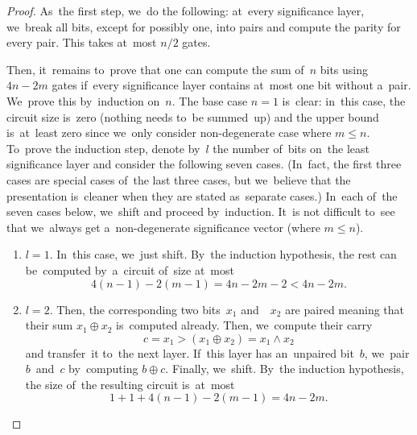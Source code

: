 \documentclass[sigconf, review, anonymous]{acmart}
\begin{document}
\begin{proof}
    As~the first step, we~do the following: at~every significance layer,
    we~break all bits, except for possibly one, into pairs and compute
    the parity for every pair. This takes at~most $n/2$ gates.

    \begin{center}
    \end{center}

    Then, it~remains to~prove that one can compute the sum of~$n$ bits
    using $4n-2m$ gates if~every significance layer contains at~most one bit
    without a~pair. We~prove this by~induction on~$n$. The base case $n=1$ is~clear: in~this case, the circuit size is~zero (nothing needs to~be summed~up) and the upper bound is~at~least zero since we~only consider
    non-degenerate case where $m \le n$. To~prove the induction step,
    denote by~$l$ the number of~bits on~the least significance layer and consider the following seven cases. (In~fact, the first three cases are special cases of~the last three cases, but we~believe that the presentation is~cleaner when they are stated
    as~separate cases.)
    In~each of~the seven cases below, we~shift and proceed by~induction.
    It~is not difficult to~see that we~always get a~non-degenerate significance
    vector (where $m \le n$). 

    \begin{enumerate}
        \item $l=1$. In~this case, we~just shift.
        By~the induction hypothesis, the rest can be~computed by~a~circuit
        of~size at~most
        \[4(n-1)-2(m-1)=4n-2m-2<4n-2m.\]

        \item $l=2$. Then, the corresponding two bits~$x_1$ and~~$x_2$ are paired meaning that their sum $x_1 \oplus x_2$ is~computed already.
        Then, we~compute their carry
        \[c=x_1 > (x_1 \oplus x_2)=x_1 \land x_2\]
        and transfer~it to~the next layer.
        If~this layer has an~unpaired bit~$b$, we~pair $b$~and~$c$
        by~computing $b \oplus c$. Finally, we~shift.
        By~the induction hypothesis, the size of~the resulting circuit is~at~most
        \[1+1+4(n-1)-2(m-1)=4n-2m.\]


\end{enumerate}
\end{proof}
\end{document}
